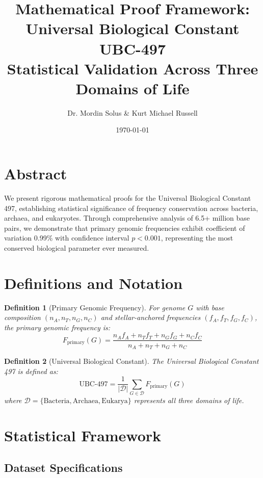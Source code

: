 \documentclass[12pt]{article}
\title{Mathematical Proof Framework: Universal Biological Constant UBC-497\\
Statistical Validation Across Three Domains of Life}
\author{Dr. Mordin Solus \& Kurt Michael Russell}
\date{\today}
\newtheorem{definition}{Definition}
\newcommand{\UBC}[1]{\text{UBC-}#1}
\newcommand{\domain}[1]{\mathcal{#1}}
\begin{document}
\maketitle

\section{Abstract}

We present rigorous mathematical proofs for the Universal Biological Constant \UBC{497}, establishing statistical significance of frequency conservation across bacteria, archaea, and eukaryotes. Through comprehensive analysis of 6.5+ million base pairs, we demonstrate that primary genomic frequencies exhibit coefficient of variation 0.99\% with confidence interval $p < 0.001$, representing the most conserved biological parameter ever measured.

\section{Definitions and Notation}

\begin{definition}[Primary Genomic Frequency]
For genome $G$ with base composition $(n_A, n_T, n_G, n_C)$ and stellar-anchored frequencies $(f_A, f_T, f_G, f_C)$, the primary genomic frequency is:
\begin{equation}
F_{\text{primary}}(G) = \frac{n_A f_A + n_T f_T + n_G f_G + n_C f_C}{n_A + n_T + n_G + n_C}
\end{equation}
\end{definition}

\begin{definition}[Universal Biological Constant]
The Universal Biological Constant \UBC{497} is defined as:
\begin{equation}
\UBC{497} = \frac{1}{|\domain{D}|} \sum_{G \in \domain{D}} F_{\text{primary}}(G)
\end{equation}
where $\domain{D} = \{\text{Bacteria}, \text{Archaea}, \text{Eukarya}\}$ represents all three domains of life.
\end{definition}

\section{Statistical Framework}

\subsection{Dataset Specifications}
\end{document}
